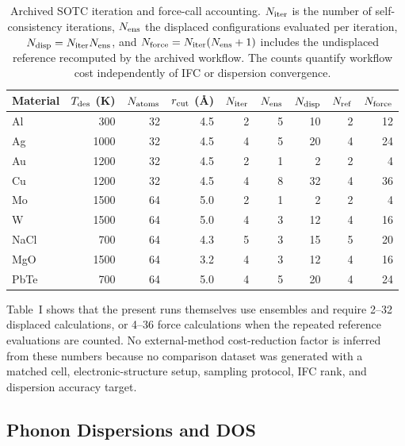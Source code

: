 \documentclass[aps,prb,reprint,amsmath,amssymb,floatfix]{revtex4-2}
\begin{document}
\color{revisionblue}
\begin{table}[htbp]
\color{black}

\color{revisionblue}
\caption{Archived SOTC iteration and force-call accounting.
\(N_{\rm iter}\) is the number of self-consistency iterations,
\(N_{\rm ens}\) the displaced configurations evaluated per iteration,
\(N_{\rm disp}=N_{\rm iter}N_{\rm ens}\), and
\(N_{\rm force}=N_{\rm iter}(N_{\rm ens}+1)\) includes the undisplaced
reference recomputed by the archived workflow. The counts quantify workflow
cost independently of IFC or dispersion convergence.}
\begin{ruledtabular}
\begin{tabular}{lrrrrrrrr}
Material & \(T_{\rm des}\) (K) & \(N_{\rm atoms}\) & \(r_{\rm cut}\) (Å) &
\(N_{\rm iter}\) & \(N_{\rm ens}\) & \(N_{\rm disp}\) &
\(N_{\rm ref}\) & \(N_{\rm force}\) \\
\hline
Al   & 300  & 32 & 4.5 & 2 & 5 & 10 & 2 & 12 \\
Ag   & 1000 & 32 & 4.5 & 4 & 5 & 20 & 4 & 24 \\
Au   & 1200 & 32 & 4.5 & 2 & 1 &  2 & 2 &  4 \\
Cu   & 1200 & 32 & 4.5 & 4 & 8 & 32 & 4 & 36 \\
Mo   & 1500 & 64 & 5.0 & 2 & 1 &  2 & 2 &  4 \\
W    & 1500 & 64 & 5.0 & 4 & 3 & 12 & 4 & 16 \\
NaCl & 700  & 64 & 4.3 & 5 & 3 & 15 & 5 & 20 \\
MgO  & 1500 & 64 & 3.2 & 4 & 3 & 12 & 4 & 16 \\
PbTe & 700  & 64 & 5.0 & 4 & 5 & 20 & 4 & 24 \\
\end{tabular}
\end{ruledtabular}
\label{tab:1}
\color{black}

\color{revisionblue}
\end{table}
\color{black}

\color{revisionblue}
Table~I shows that the present runs themselves use ensembles and require
2--32 displaced calculations, or 4--36 force calculations when the repeated
reference evaluations are counted. No external-method cost-reduction factor
is inferred from these numbers
because no comparison dataset was generated with a matched cell,
electronic-structure setup, sampling protocol, IFC rank, and dispersion
accuracy target.
\color{black}

\subsection{Phonon Dispersions and
DOS}\label{phonon-dispersions-and-dos}
\end{document}
